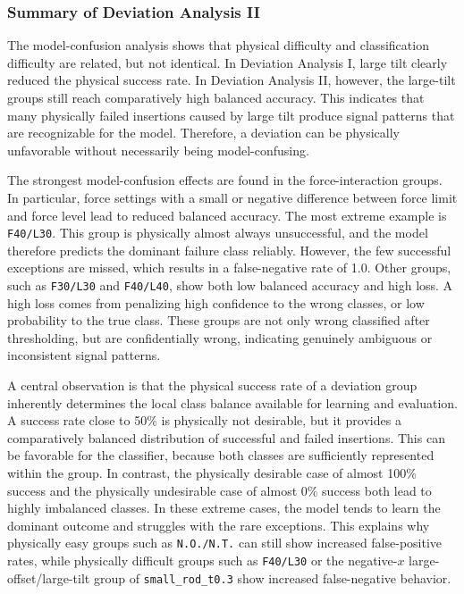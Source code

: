 \subsubsection{Summary of Deviation Analysis II}
\label{subsubsec:da2_summary}

The model-confusion analysis shows that physical difficulty and classification difficulty are related, but not identical. In Deviation Analysis I, large tilt clearly reduced the physical success rate. In Deviation Analysis II, however, the large-tilt groups still reach comparatively high balanced accuracy. This indicates that many physically failed insertions caused by large tilt produce signal patterns that are recognizable for the model. Therefore, a deviation can be physically unfavorable without necessarily being model-confusing.

The strongest model-confusion effects are found in the force-interaction groups. In particular, force settings with a small or negative difference between force limit and force level lead to reduced balanced accuracy. The most extreme example is \texttt{F40/L30}. This group is physically almost always unsuccessful, and the model therefore predicts the dominant failure class reliably. However, the few successful exceptions are missed, which results in a false-negative rate of 1.0. Other groups, such as \texttt{F30/L30} and \texttt{F40/L40}, show both low balanced accuracy and high loss. A high loss comes from penalizing high confidence to the wrong classes, or low probability to the true class. These groups are not only wrong classified after thresholding, but are confidentially wrong, indicating genuinely ambiguous or inconsistent signal patterns.

A central observation is that the physical success rate of a deviation group inherently determines the local class balance available for learning and evaluation. A success rate close to 50\% is physically not desirable, but it provides a comparatively balanced distribution of successful and failed insertions. This can be favorable for the classifier, because both classes are sufficiently represented within the group. In contrast, the physically desirable case of almost 100\% success and the physically undesirable case of almost 0\% success both lead to highly imbalanced classes. In these extreme cases, the model tends to learn the dominant outcome and struggles with the rare exceptions. This explains why physically easy groups such as \texttt{N.O./N.T.} can still show increased false-positive rates, while physically difficult groups such as \texttt{F40/L30} or the negative-$x$ large-offset/large-tilt group of \texttt{small\_rod\_t0.3} show increased false-negative behavior.

